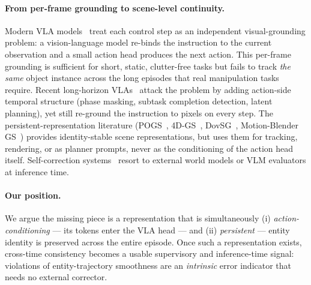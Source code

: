 \documentclass[10pt,letterpaper]{article}
\begin{document}
\paragraph{From per-frame grounding to scene-level continuity.}
Modern VLA models~\cite{rt2,openvla,pi0} treat each control step as an
independent visual-grounding problem: a vision-language model re-binds the
instruction to the current observation and a small action head produces
the next action. This per-frame grounding is sufficient for short, static,
clutter-free tasks but fails to track \emph{the same} object instance
across the long episodes that real manipulation tasks require.
Recent long-horizon VLAs~\cite{longvla,seqvla,seer} attack the problem by
adding action-side temporal structure (phase masking, subtask completion
detection, latent planning), yet still re-ground the instruction to pixels
on every step. The persistent-representation literature
(POGS~\cite{pogs}, 4D-GS~\cite{fourdgs}, DovSG~\cite{dovsg},
Motion-Blender GS~\cite{motionblender}) provides identity-stable scene
representations, but uses them for tracking, rendering, or as planner
prompts, never as the conditioning of the action head itself.
Self-correction systems~\cite{vlaintheloop,recapa,kitchenvla} resort to
external world models or VLM evaluators at inference time.

\paragraph{Our position.}
We argue the missing piece is a representation that is simultaneously
(i) \emph{action-conditioning} — its tokens enter the VLA head — and
(ii) \emph{persistent} — entity identity is preserved across the entire
episode. Once such a representation exists, cross-time consistency
becomes a usable supervisory and inference-time signal: violations of
entity-trajectory smoothness are an \emph{intrinsic} error indicator that
needs no external corrector.
\end{document}
